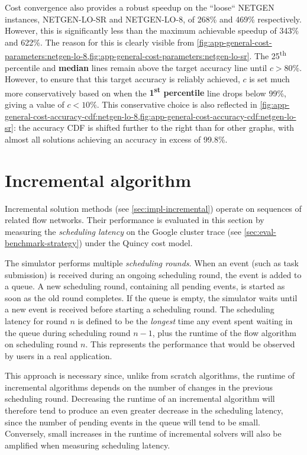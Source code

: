 Cost convergence also provides a robust speedup on the ``loose`` NETGEN instances, NETGEN-LO-SR and NETGEN-LO-8, of 268\% and 469\% respectively. However, this is significantly less than the maximum achievable speedup of 343\% and 622\%. The reason for this is clearly visible from \cref{fig:app-general-cost-parameters:netgen-lo-8,fig:app-general-cost-parameters:netgen-lo-sr}. The 25\textsuperscript{th} percentile and \textbf{\color{matplotlib_cyan} median} lines remain above the target accuracy line until $c > 80\%$. However, to ensure that this target accuracy is reliably achieved, $c$ is set much more conservatively based on when the \textbf{\color{matplotlib_blue} 1\textsuperscript{st} percentile} line drops below 99\%, giving a value of $c < 10\%$. This conservative choice is also reflected in \cref{fig:app-general-cost-accuracy-cdf:netgen-lo-8,fig:app-general-cost-accuracy-cdf:netgen-lo-sr}: the accuracy CDF is shifted further to the right than for other graphs, with almost all solutions achieving an accuracy in excess of 99.8\%.

\section{Incremental algorithm} \label{sec:eval-incremental}

Incremental solution methods (see \cref{sec:impl-incremental}) operate on sequences of related flow networks. Their performance is evaluated in this section by measuring the \emph{scheduling latency} on the Google cluster trace (see \cref{sec:eval-benchmark-strategy}) under the Quincy cost model. 

The simulator performs multiple \emph{scheduling rounds}. When an event (such as task submission) is received during an ongoing scheduling round, the event is added to a queue. A new scheduling round, containing all pending events, is started as soon as the old round completes. If the queue is empty, the simulator waits until a new event is received before starting a scheduling round. The scheduling latency for round $n$ is defined to be the \emph{longest} time any event spent waiting in the queue during scheduling round $n-1$, plus the runtime of the flow algorithm on scheduling round $n$. This represents the performance that would be observed by users in a real application.


This approach is necessary since, unlike from scratch algorithms, the runtime of incremental algorithms depends on the number of changes in the previous scheduling round. Decreasing the runtime of an incremental algorithm will therefore tend to produce an even greater decrease in the scheduling latency, since the number of pending events in the queue will tend to be small. Conversely, small increases in the runtime of incremental solvers will also be amplified when measuring scheduling latency. 

